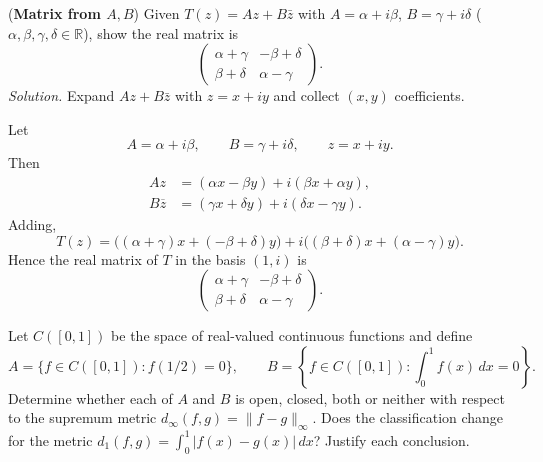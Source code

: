 \begin{problem}[CP-IV-0103]
\label{prob:cp-iv-0103}
\par\noindent\textbullet\quad (\textbf{Matrix from $A,B$})
	Given $T(z)=Az+B\bar z$ with $A=\alpha+i\beta$, $B=\gamma+i\delta$ ($\alpha,\beta,\gamma,\delta\in\mathbb{R}$), show the real matrix is
	\[
	\begin{pmatrix}
		\alpha+\gamma & -\beta+\delta\\
		\beta+\delta & \alpha-\gamma
	\end{pmatrix}.
	\]
	\emph{Solution.} Expand $Az+B\bar z$ with $z=x+iy$ and collect $(x,y)$ coefficients.
\end{problem}

\begin{solution}
Let
\[
A=\alpha+i\beta,
\qquad
B=\gamma+i\delta,
\qquad
z=x+iy.
\]
Then
\[
\begin{aligned}
Az
&=
(\alpha x-\beta y)+i(\beta x+\alpha y),\\
B\overline z
&=
(\gamma x+\delta y)+i(\delta x-\gamma y).
\end{aligned}
\]
Adding,
\[
T(z)
=
\bigl((\alpha+\gamma)x+(-\beta+\delta)y\bigr)
+
i\bigl((\beta+\delta)x+(\alpha-\gamma)y\bigr).
\]
Hence the real matrix of \(T\) in the basis \((1,i)\) is
\[
\boxed{
\begin{pmatrix}
\alpha+\gamma&-\beta+\delta\\
\beta+\delta&\alpha-\gamma
\end{pmatrix}.
}
\]
\end{solution}


\begin{problem}[CP-IV-0104]
\label{prob:cp-iv-0104}
Let $C([0,1])$ be the space of real-valued continuous functions and define
\[
 A=\{f\in C([0,1]): f(1/2)=0\},\qquad
 B=\left\{f\in C([0,1]):\int_0^1 f(x)\,dx=0\right\}.
\]
Determine whether each of $A$ and $B$ is open, closed, both or neither
with respect to the supremum metric $d_\infty(f,g)=\|f-g\|_\infty$.
Does the classification change for the metric
$d_1(f,g)=\int_0^1|f(x)-g(x)|\,dx$? Justify each conclusion.
\end{problem}

